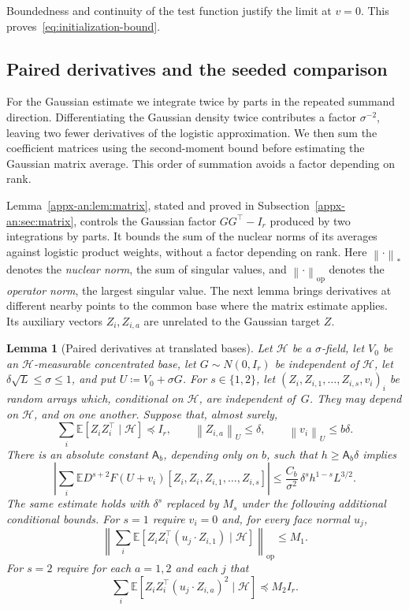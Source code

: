 \documentclass[11pt,letterpaper]{article}
\newtheorem{lemma}{Lemma}
\theoremstyle{remark}
\newcommand{\E}{\mathbb E}
\newcommand{\op}{\mathrm{op}}
\newcommand{\norm}[1]{\left\lVert#1\right\rVert}
\begin{document}
Boundedness and continuity of the test function justify the limit
at \(v=0\). This proves~\eqref{eq:initialization-bound}.

\subsection{Paired derivatives and the seeded comparison}
\label{appx-an:sec:restoration}

For the Gaussian estimate we integrate twice by parts in the repeated
summand direction. Differentiating the Gaussian density twice contributes a factor
\(\sigma^{-2}\), leaving two fewer derivatives of the logistic
approximation. We then sum the coefficient matrices using the
second-moment bound before estimating the Gaussian matrix average.
This order of summation avoids a factor depending on rank.

Lemma~\ref{appx-an:lem:matrix}, stated and proved in
Subsection~\ref{appx-an:sec:matrix}, controls the Gaussian factor
\(GG^\top-I_r\) produced by two integrations by parts. It bounds
the sum of the nuclear norms of its averages against logistic product
weights, without a factor depending on rank. Here
\(\norm{\cdot}_*\) denotes the \emph{nuclear norm}, the sum of singular
values, and \(\norm{\cdot}_\op\) denotes the \emph{operator norm},
the largest singular value. The next lemma brings derivatives at
different nearby points to the common base where the matrix estimate
applies. Its auxiliary vectors \(Z_i,Z_{i,a}\) are unrelated to the
Gaussian target \(Z\).

\begin{lemma}[Paired derivatives at translated bases]
\label{appx-an:lem:restoration}
Let \(\mathcal H\) be a \(\sigma\)-field, let \(V_0\) be an
\(\mathcal H\)-measurable concentrated base, let \(G\sim N(0,I_r)\) be
independent of \(\mathcal H\), let \(\delta\sqrt L\le\sigma\le1\), and put
\(U\coloneqq V_0+\sigma G\). For \(s\in\{1,2\}\), let
\((Z_i,Z_{i,1},\ldots,Z_{i,s},v_i)_i\) be random arrays which, conditional
on \(\mathcal H\), are independent of~\(G\). They may depend on
\(\mathcal H\), and on one another. Suppose that, almost surely,
\begin{equation}
 \sum_i\E[Z_iZ_i^\top\mid\mathcal H]\preceq I_r,
 \qquad \norm{Z_{i,a}}_U\le\delta,
 \qquad \norm{v_i}_U\le b\delta.
 \label{appx-an:conditional-budget}
\end{equation}
There is an absolute constant \(\mathsf A_b\), depending only on \(b\),
such that \(h\ge\mathsf A_b\delta\) implies
\begin{equation}
 \left|\sum_i\E D^{s+2}F(U+v_i)
         [Z_i,Z_i,Z_{i,1},\ldots,Z_{i,s}]\right|
 \le\frac{C_b}{\sigma^2}\,
                 \delta^s h^{1-s}L^{3/2}.
 \label{appx-an:restoration-bound}
\end{equation}
The same estimate holds with $\delta^s$ replaced by $M_s$ under the following additional conditional bounds. For $s=1$ require $v_i=0$ and, for every face normal $u_j$,
\[
 \left\|\sum_i\E[Z_iZ_i^\top (u_j\cdot Z_{i,1})\mid\mathcal H]\right\|_{\op}\le M_1.
\]
For $s=2$ require for each $a=1,2$ and each $j$ that
\[
 \sum_i\E[Z_iZ_i^\top (u_j\cdot Z_{i,a})^2\mid\mathcal H]\preceq M_2 I_r .
\]
\end{lemma}
\end{document}
